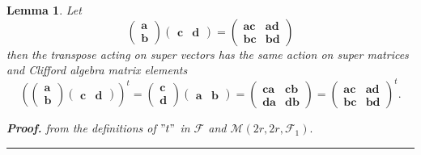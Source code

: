 \documentclass[aps,preprint]{revtex4}
\newtheorem{lemma}[theorem]{Lemma}
\newenvironment{proof}[1][Proof]{\noindent\textbf{#1.} }{\ \rule{0.5em}{0.5em}}
\begin{document}
\begin{lemma}
Let 
\begin{equation}
\left( 
\begin{array}{c}
\boldsymbol{a} \\ 
\boldsymbol{b}%
\end{array}%
\right) \left( 
\begin{array}{cc}
\boldsymbol{c} & \boldsymbol{d}%
\end{array}%
\right) =\left( 
\begin{array}{cc}
\boldsymbol{ac} & \boldsymbol{ad} \\ 
\boldsymbol{bc} & \boldsymbol{bd}%
\end{array}%
\right)
\end{equation}%
then the transpose acting on super vectors has the same action on super
matrices and Clifford algebra matrix elements 
\begin{equation}
\left( \left( 
\begin{array}{c}
\boldsymbol{a} \\ 
\boldsymbol{b}%
\end{array}%
\right) \left( 
\begin{array}{cc}
\boldsymbol{c} & \boldsymbol{d}%
\end{array}%
\right) \right) ^{t}=\left( 
\begin{array}{c}
\boldsymbol{c} \\ 
\boldsymbol{d}%
\end{array}%
\right) \left( 
\begin{array}{cc}
\boldsymbol{a} & \boldsymbol{b}%
\end{array}%
\right) =\left( 
\begin{array}{cc}
\boldsymbol{ca} & \boldsymbol{cb} \\ 
\boldsymbol{da} & \boldsymbol{db}%
\end{array}%
\right) =\left( 
\begin{array}{cc}
\boldsymbol{ac} & \boldsymbol{ad} \\ 
\boldsymbol{bc} & \boldsymbol{bd}%
\end{array}%
\right) ^{t}.
\end{equation}

\begin{proof}
from the definitions of $"t"$ in $\mathcal{F}$ and $\mathcal{M}\left( 2r,2r,%
\mathcal{F}_{1}\right) .$
\end{proof}
\end{lemma}
\end{document}
